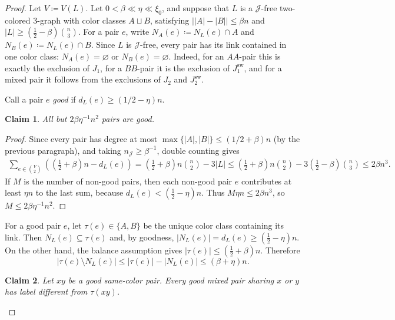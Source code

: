 \documentclass[10pt,a4paper]{article}
\theoremstyle{plain}
\newtheorem{claim}[claim]{Claim}
\theoremstyle{definition}
\begin{document}
\begin{proof}
Let $V\coloneqq V(L)$.
Let $0<\beta\ll\eta\ll\xi_0$, and suppose that $L$ is a $\mathcal J$-free two-colored $3$-graph with color classes $A\sqcup B$, satisfying $\bigl||A|-|B|\bigr|\le \beta n$ and $|L|\ge \left(\frac12-\beta\right)\binom n3$.
For a pair $e$, write $N_A(e)\coloneqq N_L(e)\cap A$ and $N_B(e)\coloneqq N_L(e)\cap B$. Since $L$ is $\mathcal J$-free, every pair has its link contained in one color class: $N_A(e)=\varnothing$ or $N_B(e)=\varnothing$.
Indeed, for an $AA$-pair this is exactly the exclusion of $J_1$, for a $BB$-pair it is the exclusion of $J_1^{\mathrm{sw}}$, and for a mixed pair it follows from the exclusions of $J_2$ and $J_2^{\mathrm{sw}}$.

Call a pair $e$ \emph{good} if $d_L(e)\ge (1/2-\eta)n$.

\begin{claim}\label{clm:many-good-pairs}
All but $2\beta\eta^{-1}n^2$ pairs are good.
\end{claim}

\begin{proof}
Since every pair has degree at most $\max\{|A|, |B|\} \le (1/2+\beta)n$ (by the previous paragraph), and taking $n_{\mathcal J}\ge\beta^{-1}$, double counting gives
\[
\begin{aligned}
\sum_{e\in\binom V2}\left(\left(\frac{1}{2}+\beta\right)n-d_L(e)\right)
=\left(\frac{1}{2}+\beta\right)n\binom n2-3|L| 
\le \left(\frac{1}{2}+\beta\right)n\binom n2-3\left(\frac{1}{2}-\beta\right)\binom n3 
\le 2\beta n^3.
\end{aligned}
\]
If $M$ is the number of non-good pairs, then each non-good pair $e$ contributes at least $\eta n$ to the last sum, because $d_L(e)<(\frac{1}{2}-\eta)n$.
Thus $M\eta n\le 2\beta n^3$, so $M\le 2\beta\eta^{-1}n^2$.
\end{proof}

For a good pair $e$, let $\tau(e)\in\{A,B\}$ be the unique color class containing its link.
Then $N_L(e)\subseteq \tau(e)$ and, by goodness, $|N_L(e)|=d_L(e)\ge(\frac{1}{2}-\eta)n$.
On the other hand, the balance assumption gives $|\tau(e)|\le(\frac{1}{2}+\beta)n$.
Therefore
\[
|\tau(e)\setminus N_L(e)| \le |\tau(e)|-|N_L(e)| \le (\beta+\eta)n.
\]

\begin{claim}\label{clm:label-propagation}
Let $xy$ be a good same-color pair.  Every good mixed pair sharing $x$ or $y$ has label different from $\tau(xy)$.
\end{claim}


\end{proof}
\end{document}
